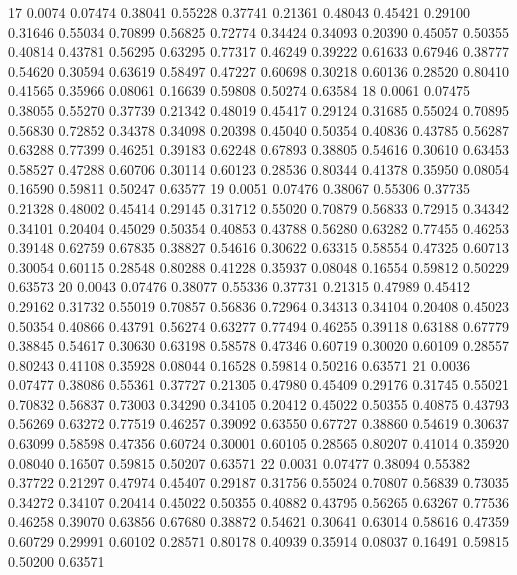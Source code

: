 \documentclass{article}
\begin{document}
\begin{Woutput}
   17      0.0074  0.07474  0.38041  0.55228  0.37741  0.21361  0.48043  0.45421  0.29100  0.31646
                   0.55034  0.70899  0.56825  0.72774  0.34424  0.34093  0.20390  0.45057  0.50355
                   0.40814  0.43781  0.56295  0.63295  0.77317  0.46249  0.39222  0.61633  0.67946
                   0.38777  0.54620  0.30594  0.63619  0.58497  0.47227  0.60698  0.30218  0.60136
                   0.28520  0.80410  0.41565  0.35966  0.08061  0.16639  0.59808  0.50274  0.63584
   18      0.0061  0.07475  0.38055  0.55270  0.37739  0.21342  0.48019  0.45417  0.29124  0.31685
                   0.55024  0.70895  0.56830  0.72852  0.34378  0.34098  0.20398  0.45040  0.50354
                   0.40836  0.43785  0.56287  0.63288  0.77399  0.46251  0.39183  0.62248  0.67893
                   0.38805  0.54616  0.30610  0.63453  0.58527  0.47288  0.60706  0.30114  0.60123
                   0.28536  0.80344  0.41378  0.35950  0.08054  0.16590  0.59811  0.50247  0.63577
   19      0.0051  0.07476  0.38067  0.55306  0.37735  0.21328  0.48002  0.45414  0.29145  0.31712
                   0.55020  0.70879  0.56833  0.72915  0.34342  0.34101  0.20404  0.45029  0.50354
                   0.40853  0.43788  0.56280  0.63282  0.77455  0.46253  0.39148  0.62759  0.67835
                   0.38827  0.54616  0.30622  0.63315  0.58554  0.47325  0.60713  0.30054  0.60115
                   0.28548  0.80288  0.41228  0.35937  0.08048  0.16554  0.59812  0.50229  0.63573
   20      0.0043  0.07476  0.38077  0.55336  0.37731  0.21315  0.47989  0.45412  0.29162  0.31732
                   0.55019  0.70857  0.56836  0.72964  0.34313  0.34104  0.20408  0.45023  0.50354
                   0.40866  0.43791  0.56274  0.63277  0.77494  0.46255  0.39118  0.63188  0.67779
                   0.38845  0.54617  0.30630  0.63198  0.58578  0.47346  0.60719  0.30020  0.60109
                   0.28557  0.80243  0.41108  0.35928  0.08044  0.16528  0.59814  0.50216  0.63571
   21      0.0036  0.07477  0.38086  0.55361  0.37727  0.21305  0.47980  0.45409  0.29176  0.31745
                   0.55021  0.70832  0.56837  0.73003  0.34290  0.34105  0.20412  0.45022  0.50355
                   0.40875  0.43793  0.56269  0.63272  0.77519  0.46257  0.39092  0.63550  0.67727
                   0.38860  0.54619  0.30637  0.63099  0.58598  0.47356  0.60724  0.30001  0.60105
                   0.28565  0.80207  0.41014  0.35920  0.08040  0.16507  0.59815  0.50207  0.63571
   22      0.0031  0.07477  0.38094  0.55382  0.37722  0.21297  0.47974  0.45407  0.29187  0.31756
                   0.55024  0.70807  0.56839  0.73035  0.34272  0.34107  0.20414  0.45022  0.50355
                   0.40882  0.43795  0.56265  0.63267  0.77536  0.46258  0.39070  0.63856  0.67680
                   0.38872  0.54621  0.30641  0.63014  0.58616  0.47359  0.60729  0.29991  0.60102
                   0.28571  0.80178  0.40939  0.35914  0.08037  0.16491  0.59815  0.50200  0.63571


\end{Woutput}
\end{document}
